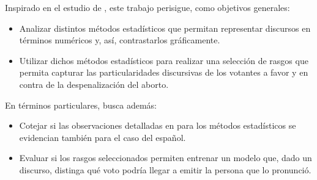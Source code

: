 Inspirado en el estudio de \cite{monroe2008fightin}, este trabajo
perisigue, como objetivos generales:

\begin{itemize}
    \item{Analizar distintos m\'etodos estad\'isticos que permitan representar
    discursos en t\'erminos num\'ericos y, as\'i, contrastarlos gr\'aficamente.}
    \item{Utilizar dichos m\'etodos estad\'isticos para realizar una selecci\'on de
    rasgos que permita capturar las particularidades discursivas de los
    votantes a favor y en contra de la despenalizaci\'on del aborto.}
\end{itemize}

En t\'erminos particulares, busca adem\'as:

\begin{itemize}
    \item{Cotejar si las observaciones detalladas en \cite{monroe2008fightin}
    para los m\'etodos estad\'isticos se evidencian
    tambi\'en para el caso del español.}
    \item{Evaluar si los rasgos seleccionados permiten entrenar un modelo que,
    dado un discurso, distinga qu\'e voto podr\'ia llegar a emitir la persona que
    lo pronunci\'o.}
\end{itemize}
